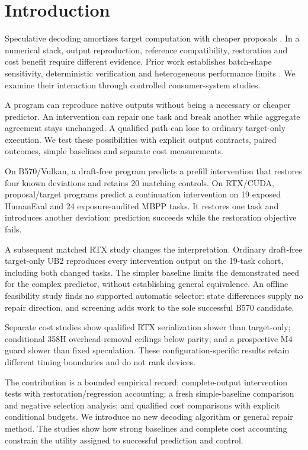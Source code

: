 \section{Introduction}
\label{sec:intro}
Speculative decoding amortizes target computation with cheaper proposals \citep{leviathan2023}. In a numerical stack, output reproduction, reference compatibility, restoration and cost benefit require different evidence. Prior work establishes batch-shape sensitivity, deterministic verification and heterogeneous performance limits \citep{numerics,llm42,lossless,illusion}. We examine their interaction through controlled consumer-system studies.

A program can reproduce native outputs without being a necessary or cheaper predictor. An intervention can repair one task and break another while aggregate agreement stays unchanged. A qualified path can lose to ordinary target-only execution. We test these possibilities with explicit output contracts, paired outcomes, simple baselines and separate cost measurements.

On B570/Vulkan, a draft-free program predicts a prefill intervention that restores four known deviations and retains 20 matching controls. On RTX/CUDA, proposal/target programs predict a continuation intervention on 19 exposed HumanEval and 24 exposure-audited MBPP tasks. It restores one task and introduces another deviation: prediction succeeds while the restoration objective fails.

A subsequent matched RTX study changes the interpretation. Ordinary draft-free target-only UB2 reproduces every intervention output on the 19-task cohort, including both changed tasks. The simpler baseline limits the demonstrated need for the complex predictor, without establishing general equivalence. An offline feasibility study finds no supported automatic selector: state differences supply no repair direction, and screening adds work to the sole successful B570 candidate.

Separate cost studies show qualified RTX serialization slower than target-only; conditional 358H overhead-removal ceilings below parity; and a prospective M4 guard slower than fixed speculation. These configuration-specific results retain different timing boundaries and do not rank devices.

The contribution is a bounded empirical record: complete-output intervention tests with restoration/regression accounting; a fresh simple-baseline comparison and negative selection analysis; and qualified cost comparisons with explicit conditional budgets. We introduce no new decoding algorithm or general repair method. The studies show how strong baselines and complete cost accounting constrain the utility assigned to successful prediction and control.
